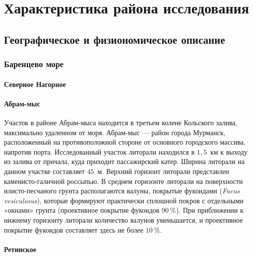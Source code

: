 
    \section{Характеристика района исследования}
        \subsection{Географическое и физиономическое описание}
            \subsubsection{Баренцево море}

            \paragraph{Северное Нагорное}

            \paragraph{Абрам-мыс}
Участок  в районе  Абрам-мыса  находится в третьем колене Кольского залива, максимально удаленном от моря.
Абрам-мыс --- район   города   Мурманск,  расположенный   на противоположной стороне от основного городского массива, напротив порта. 
Исследованный участок   литорали   находился   в   $1,5$~км   к   выходу   из   залива   от   причала,   куда   приходит пассажирский катер. 
Ширина   литорали   на   данном   участке   составляет   $45$~м.   
Верхний   горизонт   литорали представлен  каменисто-галичной  россыпью. 
В среднем  горизонте литорали на поверхности илисто-песчаного   грунта   располагаются   валуны,   покрытые   фукоидами   ({\it Fucus  vesiculosus}), которые   формируют   практически   сплошной   покров   с   отдельными   «окнами»   грунта (проективное  покрытие фукоидов $90~\%$).  
При приближении  к нижнему горизонту литорали количество   валунов   уменьшается,   и   проективное   покрытие   фукоидов   составляет   здесь   не более $10~\%$.

    \paragraph{Ретинское}


